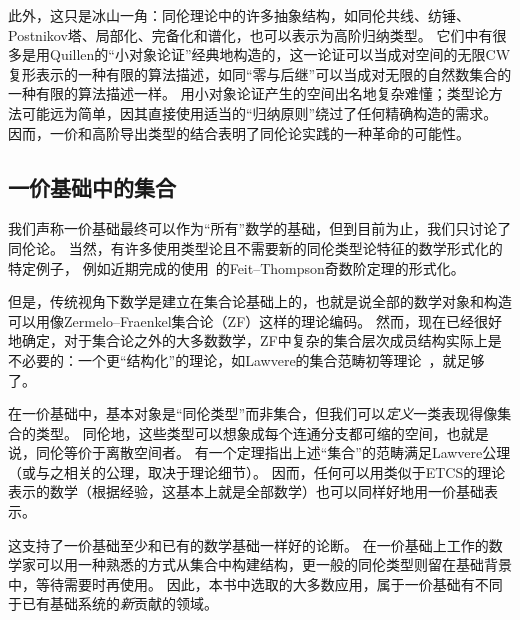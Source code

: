 此外，这只是冰山一角：同伦理论中的许多抽象结构，如同伦共线、纺锤、Postnikov塔、局部化、完备化和谱化，也可以表示为高阶归纳类型。
它们中有很多是用Quillen的“小对象论证”经典地构造的，这一论证可以当成对空间的无限CW复形表示的一种有限的算法描述，如同“零与后继”可以当成对无限的自然数集合的一种有限的算法描述一样。
用小对象论证产生的空间出名地复杂难懂；类型论方法可能远为简单，因其直接使用适当的“归纳原则”绕过了任何精确构造的需求。
因而，一价和高阶导出类型的结合表明了同伦论实践的一种革命的可能性。


\subsection*{一价基础中的集合}

%

我们声称一价基础最终可以作为“所有”数学的基础，但到目前为止，我们只讨论了同伦论。 当然，有许多使用类型论且不需要新的同伦类型论特征的数学形式化的特定例子，
%
%
%
%
%
例如近期完成的使用\Coq~\cite{gonthier}的Feit--Thompson奇数阶定理的形式化。

但是，传统视角下数学是建立在集合论基础上的，也就是说全部的数学对象和构造可以用像Zermelo--Fraenkel集合论（ZF）这样的理论编码。
%
%
%
%
然而，现在已经很好地确定，对于集合论之外的大多数数学，ZF中复杂的集合层次成员结构实际上是不必要的：一个更“结构化”的理论，如Lawvere的集合范畴初等理论~\cite{lawvere:etcs-long}，就足够了。
%

在一价基础中，基本对象是“同伦类型”而非集合，但我们可以\emph{定义}一类表现得像集合的类型。
同伦地，这些类型可以想象成每个连通分支都可缩的空间，也就是说，同伦等价于离散空间者。
%
有一个定理指出上述“集合”的范畴满足Lawvere公理（或与之相关的公理，取决于理论细节）。
因而，任何可以用类似于ETCS的理论表示的数学（根据经验，这基本上就是全部数学）也可以同样好地用一价基础表示。

这支持了一价基础至少和已有的数学基础一样好的论断。
在一价基础上工作的数学家可以用一种熟悉的方式从集合中构建结构，更一般的同伦类型则留在基础背景中，等待需要时再使用。
因此，本书中选取的大多数应用，属于一价基础有不同于已有基础系统的\emph{新}贡献的领域。

